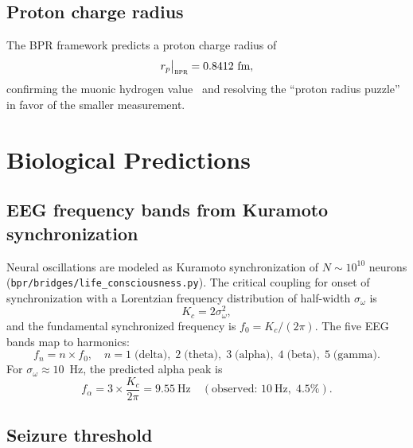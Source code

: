 \documentclass[aps,prd,twocolumn,superscriptaddress,longbibliography,nofootinbib]{revtex4-2}
\newcommand{\bpr}{\textsc{bpr}}
\begin{document}
\subsection{Proton charge radius}

The BPR framework predicts a proton charge radius of
\begin{equation}
r_p\big|_{\bpr} = 0.8412~\text{fm},
\label{eq:proton_radius}
\end{equation}
confirming the muonic hydrogen value~\cite{Pohl2010} and resolving
the ``proton radius puzzle'' in favor of the smaller measurement.


\section{Biological Predictions}
\label{sec:bio}

\subsection{EEG frequency bands from Kuramoto synchronization}

Neural oscillations are modeled as Kuramoto synchronization of
$N \sim 10^{10}$ neurons
(\texttt{bpr/bridges/life\_consciousness.py}).  The critical
coupling for onset of synchronization with a Lorentzian frequency
distribution of half-width $\sigma_\omega$ is
\begin{equation}
K_c = 2\sigma_\omega^2,
\label{eq:Kc}
\end{equation}
and the fundamental synchronized frequency is $f_0 = K_c/(2\pi)$.
The five EEG bands map to harmonics:
\begin{equation}
f_n = n \times f_0, \quad n = 1\;\text{(delta)},\; 2\;\text{(theta)},
\; 3\;\text{(alpha)},\; 4\;\text{(beta)},\; 5\;\text{(gamma)}.
\label{eq:eeg_bands}
\end{equation}
For $\sigma_\omega \approx 10$~Hz, the predicted alpha peak is
\begin{equation}
f_\alpha = 3 \times \frac{K_c}{2\pi} = 9.55~\text{Hz}
\quad (\text{observed: } 10~\text{Hz},\; 4.5\%).
\label{eq:alpha_peak}
\end{equation}

\subsection{Seizure threshold}
\end{document}
